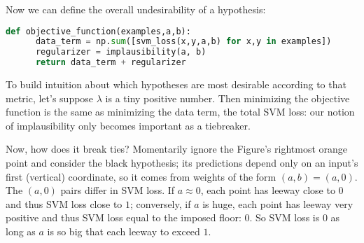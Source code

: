   Now we can define the overall undesirability of a hypothesis:
  \begin{lstlisting}[language=Python, basicstyle=\footnotesize\ttfamily]
    def objective_function(examples,a,b):
      data_term = np.sum([svm_loss(x,y,a,b) for x,y in examples])
      regularizer = implausibility(a, b)
      return data_term + regularizer
  \end{lstlisting}

  To build intuition about which hypotheses are most desirable according to
  that metric, let's suppose $\lambda$ is a tiny positive number.  Then
  minimizing the objective function is the same as minimizing the data term,
  the total SVM loss: our notion of implausibility only becomes
  important as a tiebreaker.

  \begin{marginfigure}[0cm]
    \centering
    \caption{%
      \textbf{Balancing goodness-of-fit against intrinsic plausibility leads
      to hypotheses with large margins.}
        A hypothesis's \textbf{margin} is its distance to the closest correctly
        classified training point(s).  Short stems depict these distances for
        two hypotheses (\textbf{black}, {\gre\textbf{gray}}).
        If not for the rightmost {\rng orange point}, we'd prefer \textbf{black} over
        {\gre\textbf{gray}} since it has larger margins.  With large $\lambda$ (i.e., strong
        regularization), we might prefer black over gray even with that
        rightmost {\rng orange point} included, since expanding the margin
        is worth the single misclassification.
    }
  \end{marginfigure}

  Now, how does it break ties?  Momentarily ignore the Figure's rightmost {\rng
  orange point} and consider the black hypothesis; its predictions depend only
  on an input's first (vertical) coordinate, so it comes from weights of the
  form $(a,b) = (a,0)$.
  The $(a,0)$ pairs differ in SVM loss.  If
  $a\approx 0$, each point has leeway close to $0$
  and thus SVM loss close to $1$; conversely, if $a$ is huge, each
  point has leeway very positive and thus SVM loss equal to
  the imposed floor: $0$.  So SVM loss is $0$ as long as
  $a$ is so big that each leeway to exceed $1$.

